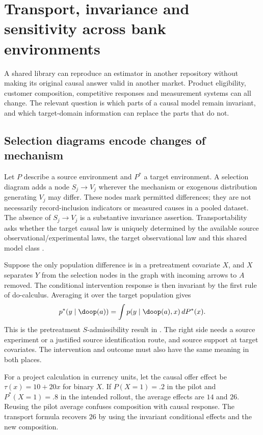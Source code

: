 \chapter{Transport, invariance and sensitivity across bank environments}
\label{r3:transport}
A shared library can reproduce an estimator in another repository
without making its original causal answer valid in another market.
Product eligibility, customer composition, competitive responses and
measurement systems can all change. The relevant question is which
parts of a causal model remain invariant, and which target-domain
information can replace the parts that do not.

\section{Selection diagrams encode changes of mechanism}
\label{r3:selection-diagram}
Let $P$ describe a source environment and $P^*$ a target environment.
A selection diagram adds a node $S_j\to V_j$ wherever the mechanism
or exogenous distribution generating $V_j$ may differ. These nodes
mark permitted differences; they are not necessarily record-inclusion
indicators or measured causes in a pooled dataset. The absence of
$S_j\to V_j$ is a substantive invariance assertion. Transportability
asks whether the target causal law is uniquely determined by the
available source observational/experimental laws, the target
observational law and this shared model class
\citep[Definitions 4--5]{pearltransport2014}.

Suppose the only population difference is in a pretreatment covariate
$X$, and $X$ separates $Y$ from the selection nodes in the graph with
incoming arrows to $A$ removed. The conditional intervention response
is then invariant by the first rule of do-calculus. Averaging it
over the target population gives
\begin{equation}
 p^*(y\mid\doop(a))
     =\int p(y\mid\doop(a),x)\,dP^*(x).
 \label{r3:transport-formula}
\end{equation}
This is the pretreatment $S$-admissibility result in
\citet[Theorem 2 and Corollary 1]{pearltransport2014}. The right
side needs a source experiment or a justified source identification
route, and source support at target covariates. The intervention and
outcome must also have the same meaning in both places.

For a project calculation in currency units, let the causal offer
effect be $\tau(x)=10+20x$ for binary $X$. If $P(X=1)=.2$ in the
pilot and $P^*(X=1)=.8$ in the intended rollout, the average effects
are $14$ and $26$. Reusing the pilot average confuses composition
with causal response. The transport formula recovers $26$ by using
the invariant conditional effects and the new composition.

